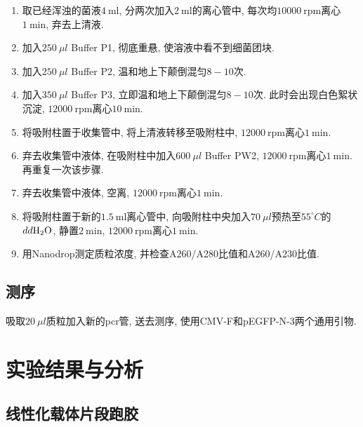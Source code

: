 \documentclass{article}
\begin{document}
\begin{enumerate}
    \item 取已经浑浊的菌液$4\ \mbox{ml}$, 分两次加入$2\ \mbox{ml}$的离心管中, 每次均$10000\ \mbox{rpm}$离心$1\ \mbox{min}$, 弃去上清液.
    \item 加入$250\ \mu l$ Buffer P1, 彻底重悬, 使溶液中看不到细菌团块.
    \item 加入$250\ \mu l$ Buffer P2, 温和地上下颠倒混匀$8-10$次.
    \item 加入$350\ \mu l$ Buffer P3, 立即温和地上下颠倒混匀$8-10$次. 此时会出现白色絮状沉淀, $12000\ \mbox{rpm}$离心$10\ \mbox{min}$.
    \item 将吸附柱置于收集管中, 将上清液转移至吸附柱中, $12000\ \mbox{rpm}$离心$1\ \mbox{min}$.
    \item 弃去收集管中液体, 在吸附柱中加入$600\ \mu l$ Buffer PW2, $12000\ \mbox{rpm}$离心$1\ \mbox{min}$. 再重复一次该步骤.
    \item 弃去收集管中液体, 空离, $12000\ \mbox{rpm}$离心$1\ \mbox{min}$.
    \item 将吸附柱置于新的$1.5\ \mbox{ml}$离心管中, 向吸附柱中央加入$70\ \mu l$预热至$55^\circ C$的$dd\ce{H2O}$, 静置$2\ \mbox{min}$, $12000\ \mbox{rpm}$离心$1\ \mbox{min}$.
    \item 用Nanodrop测定质粒浓度, 并检查A260/A280比值和A260/A230比值.
\end{enumerate}

\subsection{测序}

吸取$20\ \mu l$质粒加入新的pcr管, 送去测序, 使用CMV-F和pEGFP-N-3两个通用引物.

\section{实验结果与分析}

\subsection{线性化载体片段跑胶}
\end{document}
